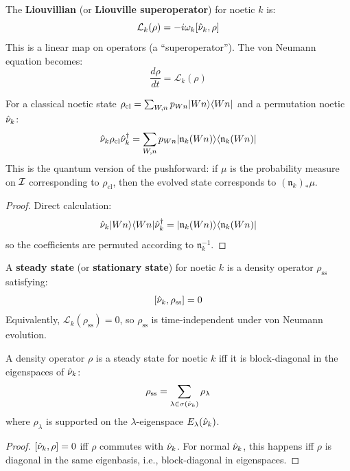 \begin{definition}
\label{def:liouvillian}
The \textbf{Liouvillian} (or \textbf{Liouville superoperator}) for noetic $k$ is:
\[
\mathcal{L}_k(\rho) = -i\omega_k[\hat{\nu}_k, \rho]
\]
This is a linear map on operators (a ``superoperator''). The von Neumann equation becomes:
\[
\frac{d\rho}{dt} = \mathcal{L}_k(\rho)
\]
\end{definition}

\begin{proposition}
\label{prop:classical-iteration-relation}
For a classical noetic state $\rho_{\mathrm{cl}} = \sum_{W,n} p_{Wn} |Wn\rangle\langle Wn|$ and a permutation noetic $\hat{\nu}_k$:
\[
\hat{\nu}_k \rho_{\mathrm{cl}} \hat{\nu}_k^\dagger = \sum_{W,n} p_{Wn} |\mathfrak{n}_k(Wn)\rangle\langle \mathfrak{n}_k(Wn)|
\]
This is the quantum version of the pushforward: if $\mu$ is the probability measure on $\mathcal{I}$ corresponding to $\rho_{\mathrm{cl}}$, then the evolved state corresponds to $(\mathfrak{n}_k)_* \mu$.
\end{proposition}

\begin{proof}
Direct calculation:
\[
\hat{\nu}_k |Wn\rangle\langle Wn| \hat{\nu}_k^\dagger = |\mathfrak{n}_k(Wn)\rangle\langle \mathfrak{n}_k(Wn)|
\]
so the coefficients are permuted according to $\mathfrak{n}_k^{-1}$.
\end{proof}

\begin{definition}
\label{def:steady-state}
A \textbf{steady state} (or \textbf{stationary state}) for noetic $k$ is a density operator $\rho_{\mathrm{ss}}$ satisfying:
\[
[\hat{\nu}_k, \rho_{\mathrm{ss}}] = 0
\]
Equivalently, $\mathcal{L}_k(\rho_{\mathrm{ss}}) = 0$, so $\rho_{\mathrm{ss}}$ is time-independent under von Neumann evolution.
\end{definition}

\begin{theorem}
\label{thm:steady-state-char}
A density operator $\rho$ is a steady state for noetic $k$ iff it is block-diagonal in the eigenspaces of $\hat{\nu}_k$:
\[
\rho_{\mathrm{ss}} = \sum_{\lambda \in \sigma(\hat{\nu}_k)} \rho_\lambda
\]
where $\rho_\lambda$ is supported on the $\lambda$-eigenspace $E_\lambda(\hat{\nu}_k)$.
\end{theorem}

\begin{proof}
$[\hat{\nu}_k, \rho] = 0$ iff $\rho$ commutes with $\hat{\nu}_k$. For normal $\hat{\nu}_k$, this happens iff $\rho$ is diagonal in the same eigenbasis, i.e., block-diagonal in eigenspaces.
\end{proof}

